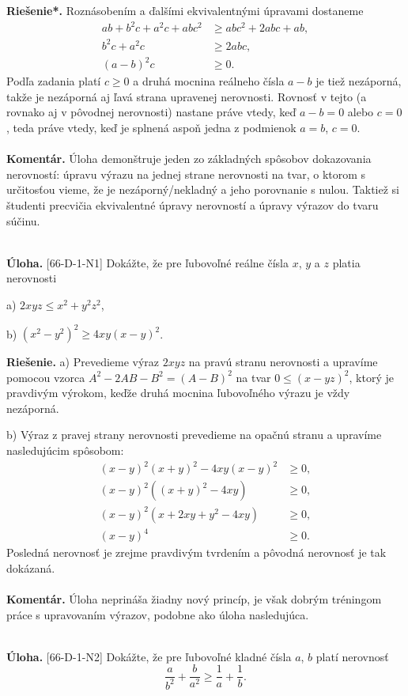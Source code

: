 \documentclass[11pt,a4paper,oneside,final]{book}
\newcommand{\kom}{\textbf{Komentár.} }
\newcommand{\ul}{\textbf{Úloha.} }
\newcommand{\rie}{\textbf{Riešenie.} }
\newcommand{\rieh}{\textbf{Riešenie*.} }
\begin{document}
\rieh Roznásobením a ďalšími ekvivalentnými úpravami dostaneme
\begin{align*}
ab + b^2 c + a^2 c + abc^2 &\geq abc^2 + 2abc + ab,\\
b^2 c + a^2 c &\geq 2abc,\\
(a - b)^2 c &\geq 0.
\end{align*}
Podľa zadania platí $c \geq 0$ a druhá mocnina reálneho čísla $a-b$ je tiež nezáporná, takže je nezáporná aj ľavá strana upravenej nerovnosti. Rovnosť v tejto (a rovnako aj v pôvodnej nerovnosti) nastane práve vtedy, keď $a - b = 0$ alebo $c = 0$, teda práve vtedy, keď je splnená aspoň jedna z podmienok $a = b$, $c = 0$.\\
\\
\kom Úloha demonštruje jeden zo základných spôsobov dokazovania nerovností: úpravu výrazu na jednej strane nerovnosti na tvar, o ktorom s určitosťou vieme, že je nezáporný/nekladný a jeho porovnanie s nulou. Taktiež si študenti precvičia ekvivalentné úpravy nerovností a úpravy výrazov do tvaru súčinu.\\
\\
\begin{tcolorbox}[breakable,notitle,boxrule=0pt,colback=light-gray,colframe=light-gray]\ul [66-D-1-N1] Dokážte, že pre ľubovoľné reálne čísla $x$, $y$ a $z$ platia nerovnosti

a) $2xyz \leq x^2+ y^2z^2$,

b) $(x^2-y^2)^2\geq 4xy(x - y)^2$.

\end{tcolorbox}

\rie a) Prevedieme výraz $2xyz$ na pravú stranu nerovnosti a upravíme pomocou vzorca $A^2-2AB-B^2=(A-B)^2$ na tvar $0 \leq (x - yz)^2$, ktorý je pravdivým výrokom, keďže druhá mocnina ľubovoľného výrazu je vždy nezáporná.

b) Výraz z pravej strany nerovnosti prevedieme na opačnú stranu a upravíme nasledujúcim spôsobom:
\begin{align*}
(x-y)^2(x+y)^2-4xy(x-y)^2 &\geq 0,\\
(x-y)^2((x+y)^2-4xy) &\geq 0,\\
(x-y)^2(x+2xy+y^2-4xy) &\geq 0,\\
(x-y)^4 &\geq 0.
\end{align*}
Posledná nerovnosť je zrejme pravdivým tvrdením a pôvodná nerovnosť je tak dokázaná.\\
\\
\kom Úloha neprináša žiadny nový princíp, je však dobrým tréningom práce s upravovaním výrazov, podobne ako úloha nasledujúca.\\
\\
\begin{tcolorbox}[breakable,notitle,boxrule=0pt,colback=light-gray,colframe=light-gray]\ul [66-D-1-N2] Dokážte, že pre ľubovoľné kladné čísla $a$, $b$ platí nerovnosť $$\frac{a}{b^2}+ \frac{b}{a^2}\geq \frac{1}{a} + \frac{1}{b}.$$

\end{tcolorbox}
\end{document}
